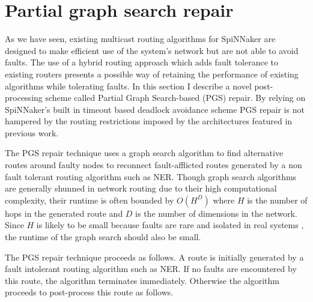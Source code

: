 	\section{Partial graph search repair}
		
		As we have seen, existing multicast routing algorithms for SpiNNaker are
		designed to make efficient use of the system's network but are not able to
		avoid faults. The use of a hybrid routing approach which adds fault
		tolerance to existing routers presents a possible way of retaining the
		performance of existing algorithms while tolerating faults. In this section
		I describe a novel post-processing scheme called Partial Graph Search-based
		(PGS) repair.  By relying on SpiNNaker's built in timeout based deadlock
		avoidance scheme PGS repair is not hampered by the routing restrictions
		imposed by the architectures featured in previous work.
		
		The PGS repair technique uses a graph search algorithm to find alternative
		routes around faulty nodes to reconnect fault-afflicted routes generated by
		a non fault tolerant routing algorithm such as NER. Though graph search
		algorithms are generally shunned in network routing due to their high
		computational complexity, their runtime is often bounded by $O(H^D)$ where
		$H$ is the number of hops in the generated route and $D$ is the number of
		dimensions in the network.  Since $H$ is likely to be small because faults
		are rare and isolated in real systems \cite{gara05,alverson12}, the runtime
		of the graph search should also be small.
		
		The PGS repair technique proceeds as follows. A route is initially
		generated by a fault intolerant routing algorithm such as NER. If no faults
		are encountered by this route, the algorithm terminates immediately.
		Otherwise the algorithm proceeds to post-process this route as follows.
		
